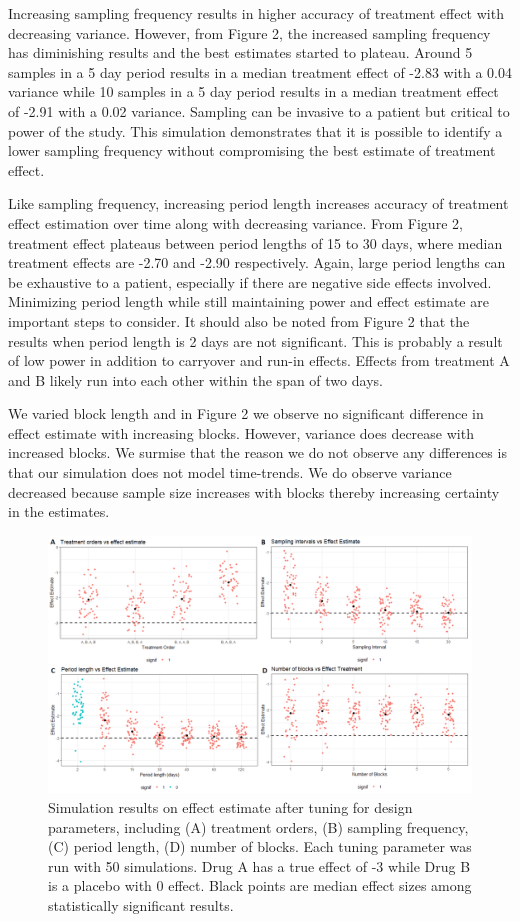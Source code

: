 \documentclass[11pt,]{article}
\begin{document}
Increasing sampling frequency results in higher accuracy of treatment
effect with decreasing variance. However, from Figure 2, the increased
sampling frequency has diminishing results and the best estimates
started to plateau. Around 5 samples in a 5 day period results in a
median treatment effect of -2.83 with a 0.04 variance while 10 samples
in a 5 day period results in a median treatment effect of -2.91 with a
0.02 variance. Sampling can be invasive to a patient but critical to
power of the study. This simulation demonstrates that it is possible to
identify a lower sampling frequency without compromising the best
estimate of treatment effect.

Like sampling frequency, increasing period length increases accuracy of
treatment effect estimation over time along with decreasing variance.
From Figure 2, treatment effect plateaus between period lengths of 15 to
30 days, where median treatment effects are -2.70 and -2.90
respectively. Again, large period lengths can be exhaustive to a
patient, especially if there are negative side effects involved.
Minimizing period length while still maintaining power and effect
estimate are important steps to consider. It should also be noted from
Figure 2 that the results when period length is 2 days are not
significant. This is probably a result of low power in addition to
carryover and run-in effects. Effects from treatment A and B likely run
into each other within the span of two days.

We varied block length and in Figure 2 we observe no significant
difference in effect estimate with increasing blocks. However, variance
does decrease with increased blocks. We surmise that the reason we do
not observe any differences is that our simulation does not model
time-trends. We do observe variance decreased because sample size
increases with blocks thereby increasing certainty in the estimates.

\begin{figure}

{\centering \includegraphics[width=0.8\linewidth]{./img/combined_case_study} 

}

\caption{Simulation results on effect estimate after tuning for design parameters, including (A) treatment orders, (B) sampling frequency, (C) period length, (D) number of blocks. Each tuning parameter was run with 50 simulations. Drug A has a true effect of -3 while Drug B is a placebo with 0 effect. Black points are median effect sizes among statistically significant results.}\label{fig:unnamed-chunk-3}
\end{figure}
\end{document}
